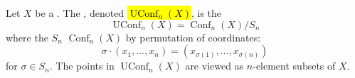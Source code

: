 \begin{definition} \label{definition:unordered_configuration_space_of_n_points_in_a_topological_space}
Let $X$ be a .
The , denoted \hl{$\operatorname{UConf}_n(X)$}, is the 
$$\operatorname{UConf}_n(X) = \operatorname{Conf}_n(X) / S_n$$
where the  $S_n$  $\operatorname{Conf}_n(X)$ by permutation of coordinates:
$$\sigma \cdot (x_1, \dots, x_n) = (x_{\sigma(1)}, \dots, x_{\sigma(n)})$$
for $\sigma \in S_n$. The points in $\operatorname{UConf}_n(X)$ are viewed as $n$-element subsets of $X$.
\end{definition}